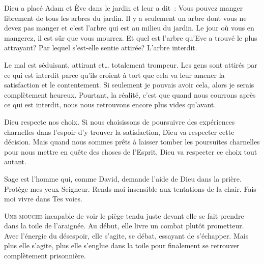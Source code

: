 Dieu a placé Adam et Ève dans le jardin et leur a dit~:
 \og Vous pouvez manger librement de tous les arbres du jardin.
 Il y a seulement un arbre dont vous ne devez pas manger et c'est l'arbre
 qui est au milieu du jardin. Le jour où vous en mangerez,
 il est sûr que vous mourrez. \fg{}
 Et quel est l'arbre qu'Eve a trouvé le plus attrayant?
 Par lequel s'est-elle sentie attirée? L'arbre interdit.

Le mal est séduisant, attirant et\dots{} totalement trompeur.
 Les gens sont attirés par ce qui est interdit parce qu'ils croient
 à tort que cela va leur amener la satisfaction et le contentement.
 \og Si seulement je pouvais avoir cela,
 alors je serais complètement heureux. \fg{}
 Pourtant, la réalité, c'est que quand nous courrons après ce qui est interdit,
 nous nous retrouvons encore plus vides qu'avant.


Dieu respecte nos choix. Si nous choisissons de poursuivre des expériences
 charnelles dans l'espoir d'y trouver la satisfaction,
 Dieu va respecter cette décision.
 Mais quand nous sommes prêts à laisser tomber les poursuites charnelles
 pour nous mettre en quête des choses de l'Esprit,
 Dieu va respecter ce choix tout autant.

Sage est l'homme qui, comme David, demande l'aide de Dieu dans la prière.
 \og Protège mes yeux Seigneur.
 Rends-moi insensible aux tentations de la chair.
 Fais-moi vivre dans Tes voies. \fg{}

\dvrule







\lettrine{U}{ne mouche}
 \ocadr incapable de voir le piège tendu juste devant elle \fcadr{}
 se fait prendre dans la toile de l'araignée.
 Au début, elle livre un combat plutôt prometteur.
 Avec l'énergie du désespoir, elle s'agite, se débat,
 essayant de s'échapper.
 Mais plus elle s'agite, plus elle s'englue dans la toile
 pour finalement se retrouver complètement prisonnière. 


